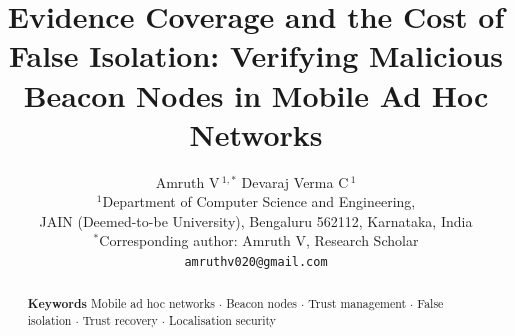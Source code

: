 \documentclass[12pt]{article}
\title{\textbf{Evidence Coverage and the Cost of False Isolation: Verifying
Malicious Beacon Nodes in Mobile Ad Hoc Networks}}
\author{%
  \normalsize Amruth V\,$^{1,\ast}$ \quad Devaraj Verma C\,$^{1}$ \\[8pt]
  \small $^{1}$Department of Computer Science and Engineering, \\
  \small JAIN (Deemed-to-be University), Bengaluru 562112, Karnataka, India \\[6pt]
  \small $^{\ast}$Corresponding author: Amruth V, Research Scholar \\
  \small \texttt{amruthv020@gmail.com}%
}
\date{}
\begin{document}
\maketitle

\begin{abstract}
\noindent 

\medskip
\noindent\textbf{Keywords} Mobile ad hoc networks $\cdot$ Beacon nodes
$\cdot$ Trust management $\cdot$ False isolation $\cdot$ Trust recovery
$\cdot$ Localisation security
\end{abstract}











\end{document}
